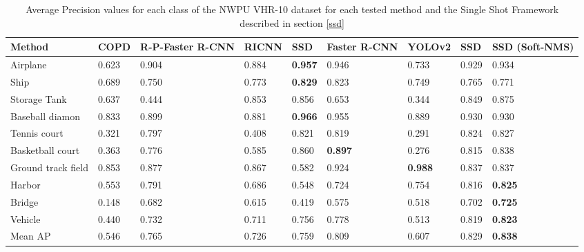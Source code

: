 \begin{landscape}
\begin{table}[]
	\centering
	\begin{tabular}{@{}lllllllll@{}}
		\toprule
		Method             & COPD  & R-P-Faster R-CNN & RICNN & SSD            & Faster R-CNN   & YOLOv2         & SSD & SSD (Soft-NMS) \\ \midrule
		Airplane           & 0.623 & 0.904            & 0.884 & \textbf{0.957} & 0.946          & 0.733          & 0.929    & 0.934               \\
		Ship               & 0.689 & 0.750            & 0.773 & \textbf{0.829} & 0.823          & 0.749          & 0.765    & 0.771               \\
		Storage Tank       & 0.637 & 0.444            & 0.853 & 0.856          & 0.653          & 0.344          & 0.849    & 0.875               \\
		Baseball diamon    & 0.833 & 0.899            & 0.881 & \textbf{0.966} & 0.955          & 0.889          & 0.930    & 0.930               \\
		Tennis court       & 0.321 & 0.797            & 0.408 & 0.821          & 0.819          & 0.291          & 0.824    & 0.827               \\
		Basketball court   & 0.363 & 0.776            & 0.585 & 0.860          & \textbf{0.897} & 0.276          & 0.815    & 0.838               \\
		Ground track field & 0.853 & 0.877            & 0.867 & 0.582          & 0.924          & \textbf{0.988} & 0.837    & 0.837               \\
		Harbor             & 0.553 & 0.791            & 0.686 & 0.548          & 0.724          & 0.754          & 0.816    & \textbf{0.825}      \\
		Bridge             & 0.148 & 0.682            & 0.615 & 0.419          & 0.575          & 0.518          & 0.702    & \textbf{0.725}      \\
		Vehicle            & 0.440 & 0.732            & 0.711 & 0.756          & 0.778          & 0.513          & 0.819    & \textbf{0.823}      \\
		Mean AP            & 0.546 & 0.765            & 0.726 & 0.759          & 0.809          & 0.607          & 0.829    & \textbf{0.838}      \\ \bottomrule
	\end{tabular}
	\caption{Average Precision values for each class of the NWPU VHR-10 dataset for each tested method and the Single Shot Framework described in section \ref{ssd}}
	\label{tab:SSDresNWPU}
\end{table}
\end{landscape}


